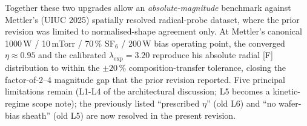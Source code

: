 Together these two upgrades allow an \emph{absolute-magnitude} benchmark
against Mettler's (UIUC 2025) spatially resolved radical-probe dataset,
where the prior revision was limited to normalised-shape agreement only.
At Mettler's canonical 1000\,W / 10\,mTorr / 70\,\% SF$_6$ / 200\,W bias
operating point, the converged $\eta \approx 0.95$ and the calibrated
$\lambda_\mathrm{exp} = 3.20$ reproduce his absolute radial [F]
distribution to within the $\pm 20\,\%$ composition-transfer tolerance,
closing the factor-of-2--4 magnitude gap that the prior revision
reported.  Five principal limitations remain (L1-L4 of the architectural
discussion; L5 becomes a kinetic-regime scope note); the previously listed
``prescribed $\eta$'' (old L6) and ``no wafer-bias sheath'' (old L5) are
now resolved in the present revision.

